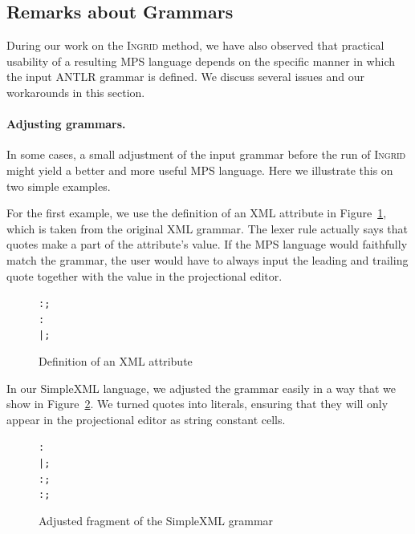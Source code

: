 \subsection{Remarks about Grammars}

During our work on the \textsc{Ingrid} method, we have also observed that practical usability of a resulting MPS language depends on the specific manner in which the input ANTLR grammar is defined.
We discuss several issues and our workarounds in this section.

\paragraph{Adjusting grammars.}
In some cases, a small adjustment of the input grammar before the run of \textsc{Ingrid} might yield a better and more useful MPS language.
Here we illustrate this on two simple examples.

For the first example, we use the definition of an XML attribute in Figure~\ref{fig:XMLATTRIB}, which is taken from the original XML grammar.
The lexer rule  actually says that quotes make a part of the attribute's value.
If the MPS language would faithfully match the grammar, the user would have to always input the leading and trailing quote together with the value in the projectional editor.

\begin{figure}[ht]
\begin{framed}
\begin{alltt}
\small
   :  \antlrliteral{=}  ;
   :  \antlrregex{~["]*} 
         |  \antlrregex{~[']*}  ;
\end{alltt}
\end{framed}
\caption{Definition of an XML attribute}
\label{fig:XMLATTRIB}
\end{figure}

In our SimpleXML language, we adjusted the grammar easily in a way that we show in Figure~\ref{fig:XMLADJUST}.
We turned quotes into literals, ensuring that they will only appear in the projectional editor as string constant cells.

\begin{figure}[ht]
\begin{framed}
\begin{alltt}
\small
   :    
         |     ;
   : \antlrregex{~["]*} ;
   : \antlrregex{~[']*} ;
\end{alltt}
\end{framed}
\caption{Adjusted fragment of the SimpleXML grammar}
\label{fig:XMLADJUST}
\end{figure}

